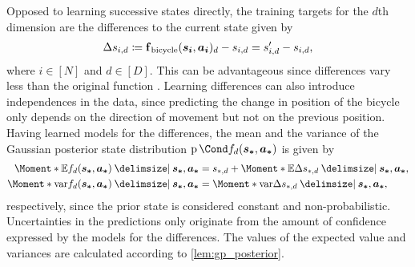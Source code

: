 Opposed to learning successive states directly, the training targets for the $d$th dimension are the differences to the current state given by
\begin{align}
    \Delta s_{i,d} \coloneqq \operatorname{\operatorname{\mathbf{f}}_{\text{bicycle}}}(\bm{s_i}, \bm{a_i})_d - s_{i,d} = s_{i,d }^\prime - s_{i,d},
\end{align}
where $i \in [N]$ and $d \in [D]$.
This can be advantageous since differences vary less than the original function \cite{deisenroth_efficient_2010}.
Learning differences can also introduce independences in the data, since predicting the change in position of the bicycle only depends on the direction of movement but not on the previous position.
Having learned models for the differences, the mean and the variance of the Gaussian posterior state distribution $\Prob{f_d(\mat{s_\ast}, \mat{a_\ast})}$ is given by
\begin{align}
    \Moment*{\E}{f_d(\mat{s_\ast}, \mat{a_\ast}) \given \mat{s_\ast}, \mat{a_\ast}} &= s_{\ast,d} + \Moment*{\E}{\Delta s_{\ast,d} \given \mat{s_\ast}, \mat{a_\ast}}, \\
    \Moment*{\var}{f_d(\mat{s_\ast}, \mat{a_\ast}) \given \mat{s_\ast}, \mat{a_\ast}} &= \Moment*{\var}{\Delta s_{\ast,d} \given \mat{s_\ast}, \mat{a_\ast}},
\end{align}
respectively, since the prior state is considered constant and non-probabilistic.
Uncertainties in the predictions only originate from the amount of confidence expressed by the models for the differences.
The values of the expected value and variances are calculated according to \cref{lem:gp_posterior}.

